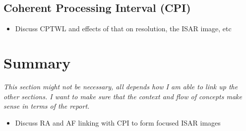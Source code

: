 \documentclass[class=report,11pt,crop=false]{standalone}
\begin{document}
    \subsection{Coherent Processing Interval (CPI)}
    \begin{itemize}
        \item Discuss CPTWL and effects of that on resolution, the ISAR image, etc
    \end{itemize}


\section{Summary}
\emph{This section might not be necessary, all depends how I am able to link up the other sections. I want to make sure that the context and flow of concepts make sense in terms of the report.}
\begin{itemize}
    \item Discuss RA and AF linking with CPI to form focused ISAR images
\end{itemize}



\ifstandalone

\printnoidxglossary[type=\acronymtype,nonumberlist]
\fi
\end{document}

